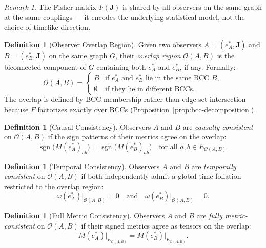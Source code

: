 \documentclass[11pt]{article}
\theoremstyle{definition}
\newtheorem{definition}[theorem]{Definition}
\theoremstyle{remark}
\newtheorem{remark}[theorem]{Remark}
\newcommand{\Fish}{F}
\newcommand{\Met}{M}
\newcommand{\vort}{\omega}
\newcommand{\coupl}{\mathbf{J}}
\begin{document}
\begin{remark}
The Fisher matrix $\Fish(\coupl)$ is shared by all observers on the same
graph at the same couplings --- it encodes the underlying statistical model,
not the choice of timelike direction.
\end{remark}

\begin{definition}[Observer Overlap Region]
\label{def:overlap-region}
Given two observers $A = (e^*_A, \coupl)$ and $B = (e^*_B, \coupl)$ on
the same graph $G$, their \emph{overlap region} $\mathcal{O}(A,B)$ is the
biconnected component of $G$ containing both $e^*_A$ and $e^*_B$, if any.
Formally:
\[
  \mathcal{O}(A,B) =
  \begin{cases}
    B & \text{if } e^*_A \text{ and } e^*_B \text{ lie in the same BCC } B, \\
    \emptyset & \text{if they lie in different BCCs.}
  \end{cases}
\]
The overlap is defined by BCC membership rather than edge-set intersection
because $\Fish$ factorizes exactly over BCCs
(Proposition~\ref{prop:bcc-decomposition}).
\end{definition}

\begin{definition}[Causal Consistency]
\label{def:causal-consistency}
Observers $A$ and $B$ are \emph{causally consistent} on
$\mathcal{O}(A,B)$ if the sign patterns of their metrics agree on the
overlap:
\[
  \operatorname{sgn}\bigl(\Met(e^*_A)_{ab}\bigr)
  = \operatorname{sgn}\bigl(\Met(e^*_B)_{ab}\bigr)
  \quad \text{for all } a, b \in E_{\mathcal{O}(A,B)}.
\]
\end{definition}

\begin{definition}[Temporal Consistency]
\label{def:temporal-consistency}
Observers $A$ and $B$ are \emph{temporally consistent} on
$\mathcal{O}(A,B)$ if both independently admit a global time foliation
restricted to the overlap region:
\[
  \vort(e^*_A)\big|_{\mathcal{O}(A,B)} = 0
  \quad \text{and} \quad
  \vort(e^*_B)\big|_{\mathcal{O}(A,B)} = 0.
\]
\end{definition}

\begin{definition}[Full Metric Consistency]
\label{def:full-consistency}
Observers $A$ and $B$ are \emph{fully metric-consistent} on $\mathcal{O}(A,B)$
if their signed metrics agree as tensors on the overlap:
\[
  \Met(e^*_A)\big|_{E_{\mathcal{O}(A,B)}}
  = \Met(e^*_B)\big|_{E_{\mathcal{O}(A,B)}}.
\]
\end{definition}
\end{document}
